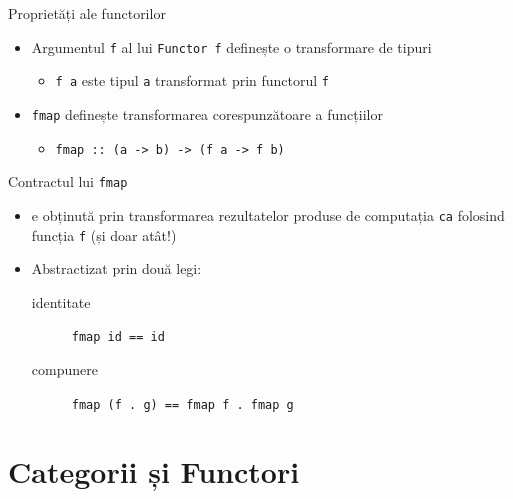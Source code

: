 \documentclass[xcolor=pdftex,romanian,colorlinks]{beamer}
\begin{document}
\begin{frame}{Proprietăți ale functorilor}
\begin{itemize}
\item Argumentul \lstinline$f$ al lui \lstinline$Functor f$ definește o transformare de tipuri 
\begin{itemize}
\item \lstinline$f a$ este tipul \lstinline$a$ transformat prin functorul \lstinline$f$
\end{itemize}
\item \lstinline$fmap$ definește transformarea corespunzătoare a funcțiilor
\begin{itemize}
\item \lstinline$fmap :: (a -> b) -> $\alert{\lstinline$($}\lstinline$f a -> f b$\alert{\lstinline$)$}
\end{itemize}
\end{itemize}
\begin{block}{Contractul lui \lstinline$fmap$}
\begin{itemize}
\item {} e obținută prin transformarea rezultatelor produse de computația \lstinline$ca$ folosind funcția \lstinline$f$ (și doar atât!)
\item Abstractizat prin două legi:
\begin{description}
\item[identitate] \lstinline$fmap id == id$
\item[compunere] \lstinline$fmap (f . g) == fmap f . fmap g$
\end{description}
\end{itemize}
\end{block}

\end{frame}

\section{Categorii și Functori}
\end{document}
